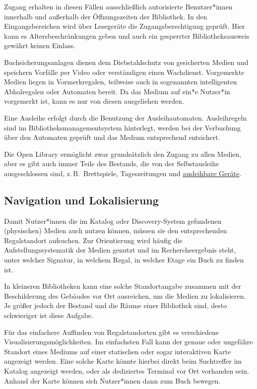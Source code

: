 \documentclass[
  11pt,
  letterpaper,
  DIV=11,
  twoside]{scrreprt}
\begin{document}
Zugang erhalten in diesen Fällen ausschließlich autorisierte
Benutzer*innen innerhalb und außerhalb der Öffnungszeiten der
Bibliothek. In den Eingangsbereichen wird über Lesegeräte die
Zugangsberechtigung geprüft. Hier kann es Altersbeschränkungen geben und
auch ein gesperrter Bibliotheksausweis gewährt keinen Einlass.

Buchsicherungsanlagen dienen dem Diebstahlschutz von gesicherten Medien
und speichern Vorfälle per Video oder verständigen einen Wachdienst.
Vorgemerkte Medien liegen in Vormerkregalen, teilweise auch in
sogenannten intelligenten Abholregalen oder Automaten bereit. Da das
Medium auf ein*e Nutzer*in vorgemerkt ist, kann es nur von diesen
ausgeliehen werden.

Eine Ausleihe erfolgt durch die Benutzung der Ausleihautomaten.
Ausleihregeln sind im Bibliotheksmanagementsystem hinterlegt, werden bei
der Verbuchung über den Automaten geprüft und das Medium entsprechend
entsichert.

Die Open Library ermöglicht zwar grundsätzlich den Zugang zu allen
Medien, aber es gibt auch immer Teile des Bestands, die von der
Selbstausleihe ausgeschlossen sind, z.\,B.~Brettspiele, Tageszeitungen
und \hyperref[ausleihbare-geruxe4te]{ausleihbare Geräte}.

\subsection{Navigation und
Lokalisierung}\label{navigation-und-lokalisierung}

Damit Nutzer*innen die im Katalog oder Discovery-System gefundenen
(physischen) Medien auch nutzen können, müssen sie den entsprechenden
Regalstandort aufsuchen. Zur Orientierung wird häufig die
Aufstellungssystematik der Medien genutzt und im Rechercheergebnis
steht, unter welcher Signatur, in welchem Regal, in welcher Etage ein
Buch zu finden ist.

In kleineren Bibliotheken kann eine solche Standortangabe zusammen mit
der Beschilderung des Gebäudes vor Ort ausreichen, um die Medien zu
lokalisieren. Je größer jedoch der Bestand und die Räume einer
Bibliothek sind, desto schwieriger ist diese Aufgabe.

Für das einfachere Auffinden von Regalstandorten gibt es verschiedene
Visualisierungsmöglichkeiten. Im einfachsten Fall kann der genaue oder
ungefähre Standort eines Mediums auf einer statischen oder sogar
interaktiven Karte angezeigt werden. Eine solche Karte könnte hierbei
direkt beim Suchtreffer im Katalog angezeigt werden, oder als
dediziertes Terminal vor Ort vorhanden sein. Anhand der Karte können
sich Nutzer*innen dann zum Buch bewegen.
\end{document}
